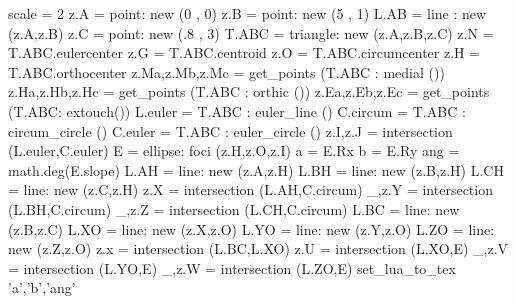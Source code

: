 \documentclass{article}
\begin{document}
\begin{tkzelements}
   scale = 2
   z.A                  = point: new (0 , 0)
   z.B                  = point: new (5 , 1)
   L.AB                 = line : new (z.A,z.B)
   z.C                  = point: new (.8 , 3)
   T.ABC                = triangle: new (z.A,z.B,z.C)
   z.N                  = T.ABC.eulercenter
   z.G                  = T.ABC.centroid
   z.O                  = T.ABC.circumcenter
   z.H                  = T.ABC.orthocenter
   z.Ma,z.Mb,z.Mc       = get_points (T.ABC : medial ())
   z.Ha,z.Hb,z.Hc       = get_points (T.ABC : orthic ())   
   z.Ea,z.Eb,z.Ec       = get_points (T.ABC: extouch())
   L.euler              = T.ABC : euler_line () 
   C.circum             = T.ABC : circum_circle () 
   C.euler              = T.ABC : euler_circle () 
   z.I,z.J              = intersection (L.euler,C.euler) 
   E                    = ellipse: foci (z.H,z.O,z.I)  
   a                    = E.Rx
   b                    = E.Ry
   ang                  = math.deg(E.slope)
   L.AH                 = line: new (z.A,z.H)
   L.BH                 = line: new (z.B,z.H)
   L.CH                 = line: new (z.C,z.H)
   z.X                  = intersection (L.AH,C.circum)  
   _,z.Y                = intersection (L.BH,C.circum)  
   _,z.Z                = intersection (L.CH,C.circum)  
   L.BC                 = line: new (z.B,z.C) 
   L.XO                 = line: new (z.X,z.O)
   L.YO                 = line: new (z.Y,z.O)
   L.ZO                 = line: new (z.Z,z.O)
   z.x                  = intersection (L.BC,L.XO)
   z.U                  = intersection (L.XO,E)
   _,z.V                = intersection (L.YO,E)
   _,z.W                = intersection (L.ZO,E)
    set_lua_to_tex {'a','b','ang'} 
 \end{tkzelements}

\end{document}
